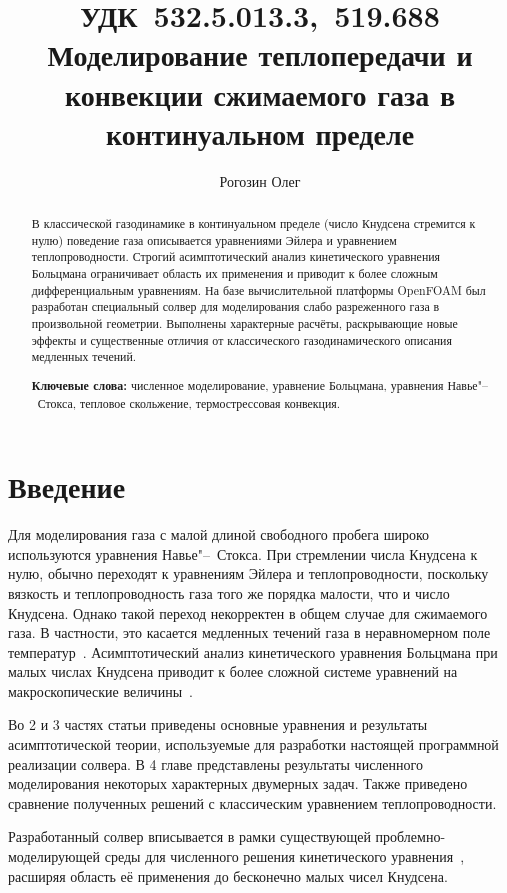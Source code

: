 \documentclass[english,russian,a4paper,10pt]{article}
\title{
	\hbox{\normalsize УДК 532.5.013.3, 519.688}\hbox{}
	Моделирование теплопередачи и конвекции сжимаемого газа в континуальном пределе
}
\author{Рогозин Олег}
\date{}
\begin{document}
\maketitle
\begin{abstract}
	В классической газодинамике в континуальном пределе (число Кнудсена стремится к нулю)
	поведение газа описывается уравнениями Эйлера и уравнением теплопроводности.
	Строгий асимптотический анализ кинетического уравнения Больцмана ограничивает область
	их применения и приводит к более сложным дифференциальным уравнениям.
	На базе вычислительной платформы OpenFOAM\textregistered{} был разработан специальный солвер
	для моделирования слабо разреженного газа в произвольной геометрии.
	Выполнены характерные расчёты, раскрывающие новые эффекты и существенные отличия
	от классического газодинамического описания медленных течений.

	\hbox{}\noindent \textbf{Ключевые слова:}
	численное моделирование, уравнение Больцмана, уравнения Навье"--~Стокса, тепловое скольжение, термострессовая конвекция.
\end{abstract}


\section{Введение}

Для моделирования газа с малой длиной свободного пробега широко используются уравнения Навье"--~Стокса.
При стремлении числа Кнудсена к нулю, обычно переходят к уравнениям Эйлера и теплопроводности,
поскольку вязкость и теплопроводность газа того же порядка малости, что и число Кнудсена.
Однако такой переход некорректен в общем случае для сжимаемого газа.
В частности, это касается медленных течений газа в неравномерном поле температур~\cite{Kogan1976,Bobylev1996}.
Асимптотический анализ кинетического уравнения Больцмана при малых числах Кнудсена приводит
к более сложной системе уравнений на макроскопические величины~\cite{Sone2002}.

Во 2 и 3 частях статьи приведены основные уравнения и результаты асимптотической теории,
используемые для разработки настоящей программной реализации солвера.
В 4 главе представлены результаты численного моделирования некоторых характерных двумерных задач.
Также приведено сравнение полученных решений с классическим уравнением теплопроводности.

Разработанный солвер вписывается в рамки существующей проблемно-моделирующей среды
для численного решения кинетического уравнения~\cite{Rogozin2011, Martynov2011},
расширяя область её применения до бесконечно малых чисел Кнудсена.
\end{document}
